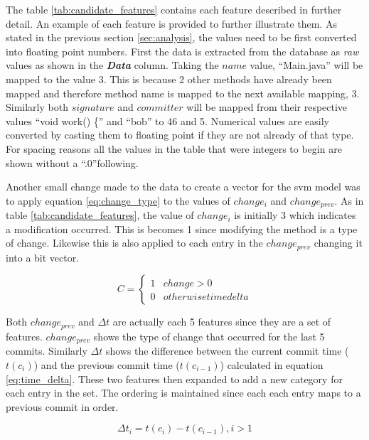The table \ref{tab:candidate_features} contains each feature described in further detail. An example of each feature is provided to further illustrate them. As stated in the previous section \ref{sec:analysis}, the values need to be first converted into floating point numbers. First the data is extracted from the database as \textit{raw} values as shown in the \textit{\textbf{Data}} column. Taking the $name$ value, ``Main.java'' will be mapped to the value 3. This is because 2 other methods have already been mapped and therefore method name is mapped to the next available mapping, 3. Similarly both $signature$ and $committer$ will be mapped from their respective values ``void work() \{'' and ``bob'' to 46 and 5. Numerical values are easily converted by casting them to floating point if they are not already of that type. For spacing reasons all the values in the table that were integers to begin are shown without a ``.0''following.

Another small change made to the data to create a vector for the \gls{svm} model was to apply equation \ref{eq:change_type} to the values of $change_i$ and $change_{prev}$. As in table \ref{tab:candidate_features}, the value of $change_i$ is initially 3 which indicates a modification occurred. This is becomes 1 since modifying the method is a type of change. Likewise this is also applied to each entry in the $change_{prev}$ changing it into a bit vector.

\begin{equation} 
\label{eq:change_type}
C = \left\{\begin{matrix}
1 & change > 0 \\
0 & otherwisetime delta
\end{matrix}\right.
\end{equation}

Both $change_{prev}$ and $\Delta t$ are actually each 5 features since they are a set of features. $change_{prev}$ shows the type of change that occurred for the last 5 commits. Similarly $\Delta t$ shows the difference between the current commit time ($t(c_i)$) and the previous commit time ($t(c_{i-1})$) calculated in equation \ref{eq:time_delta}. These two features then expanded to add a new category for each entry in the set. The ordering is maintained since each each entry maps to a previous commit in order.

\begin{equation}
\label{eq:time_delta}
\Delta t_{i} = t(c_i) - t(c_{i-1}), i > 1
\end{equation}

